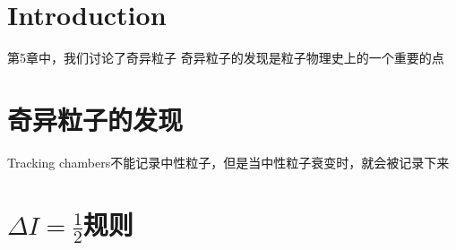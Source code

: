 \section{Introduction}
第5章中，我们讨论了奇异粒子
奇异粒子的发现是粒子物理史上的一个重要的点

\section{奇异粒子的发现}
Tracking chambers不能记录中性粒子，但是当中性粒子衰变时，就会被记录下来

\section{$\Delta I = \frac 1 2$规则}

